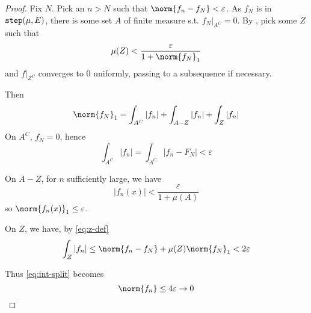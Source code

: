 \documentclass{scrartcl}
\begin{document}
\begin{proof}
  Fix $N$. Pick an $n>N$ such that $\norm{f_n-f_N}<\varepsilon$. As $f_N$ is in $\mathtt{step}(\mu,E)$, there is some set $A$ of finite measure s.t. $f_N|_{A^C}=0$. By , pick some $Z$ such that
  \begin{equation}
    \mu(Z)<\frac{\varepsilon}{1+\norm{f_N}_1}
    \label{eq:z-def}
  \end{equation}
  and $f|_{Z^C}$ converges to $0$ uniformly, passing to a subsequence if necessary. 
  
  Then
  \begin{equation}
  \norm{f_N}_1= \int_{A^C} |f_n| + \int_{A-Z} |f_n| +\int_Z |f_n|
  \label{eq:int-split}
  \end{equation}
  On $A^C$, $f_N=0$, hence
  \[
  \int_{A^C} |f_n|=\int_{A^C} |f_n-F_N| <\varepsilon
  \]

  On $A-Z$, for $n$ sufficiently large, we have
  \[
  |f_n(x)|< \frac \varepsilon {1+\mu(A)}
  \]
  so $\norm{f_n(x)}_1 \leq \varepsilon$. 

  On $Z$, we have, by \cref{eq:z-def}
  \[
  \int_Z |f_n| \leq \norm{f_n-f_N} +\mu(Z)\norm {f_N}_1 < 2\varepsilon 
  \]
  
  Thus \cref{eq:int-split} becomes
  \[
  \norm{f_n}\leq 4\varepsilon \to 0
  \]
\end{proof}
\end{document}
